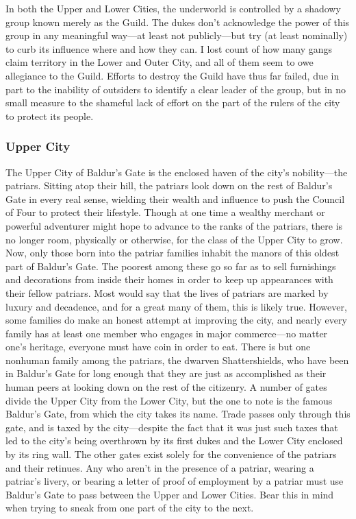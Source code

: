 \documentclass[10pt,a4paper,twoside,twocolumn,openany,bg=print,nodeprecatedcode]{dndbook}
\begin{document}
In both the Upper and Lower Cities, the underworld is controlled by a shadowy group known merely as the Guild. The dukes don't acknowledge the power of this group in any meaningful way—at least not publicly—but try (at least nominally) to curb its influence where and how they can. I lost count of how many gangs claim territory in the Lower and Outer City, and all of them seem to owe allegiance to the Guild. Efforts to destroy the Guild have thus far failed, due in part to the inability of outsiders to identify a clear leader of the group, but in no small measure to the shameful lack of effort on the part of the rulers of the city to protect its people.
\subsubsection{Upper City}
The Upper City of Baldur's Gate is the enclosed haven of the city's nobility—the patriars. Sitting atop their hill, the patriars look down on the rest of Baldur's Gate in every real sense, wielding their wealth and influence to push the Council of Four to protect their lifestyle. Though at one time a wealthy merchant or powerful adventurer might hope to advance to the ranks of the patriars, there is no longer room, physically or otherwise, for the class of the Upper City to grow. Now, only those born into the patriar families inhabit the manors of this oldest part of Baldur's Gate. The poorest among these go so far as to sell furnishings and decorations from inside their homes in order to keep up appearances with their fellow patriars.
Most would say that the lives of patriars are marked by luxury and decadence, and for a great many of them, this is likely true. However, some families do make an honest attempt at improving the city, and nearly every family has at least one member who engages in major commerce—no matter one's heritage, everyone must have coin in order to eat. There is but one nonhuman family among the patriars, the dwarven Shattershields, who have been in Baldur's Gate for long enough that they are just as accomplished as their human peers at looking down on the rest of the citizenry.
A number of gates divide the Upper City from the Lower City, but the one to note is the famous Baldur's Gate, from which the city takes its name. Trade passes only through this gate, and is taxed by the city—despite the fact that it was just such taxes that led to the city's being overthrown by its first dukes and the Lower City enclosed by its ring wall. The other gates exist solely for the convenience of the patriars and their retinues. Any who aren't in the presence of a patriar, wearing a patriar's livery, or bearing a letter of proof of employment by a patriar must use Baldur's Gate to pass between the Upper and Lower Cities. Bear this in mind when trying to sneak from one part of the city to the next.
\end{document}
